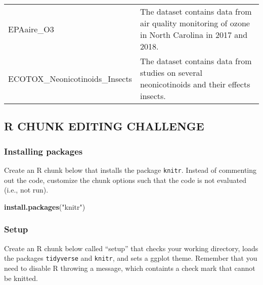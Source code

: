 \documentclass[]{article}
\newenvironment{Shaded}{\begin{snugshade}}{\end{snugshade}}
\newcommand{\KeywordTok}[1]{\textcolor[rgb]{0.13,0.29,0.53}{\textbf{#1}}}
\newcommand{\NormalTok}[1]{#1}
\newcommand{\StringTok}[1]{\textcolor[rgb]{0.31,0.60,0.02}{#1}}
\begin{document}
\begin{longtable}[]{@{}ll@{}}
\begin{minipage}[t]{0.37\columnwidth}\raggedright
EPAaire\_O3\strut
\end{minipage} & \begin{minipage}[t]{0.57\columnwidth}\raggedright
The dataset contains data from air quality monitoring of ozone in North
Carolina in 2017 and 2018.\strut
\end{minipage}\tabularnewline
\begin{minipage}[t]{0.37\columnwidth}\raggedright
ECOTOX\_Neonicotinoids\_Insects\strut
\end{minipage} & \begin{minipage}[t]{0.57\columnwidth}\raggedright
The dataset contains data from studies on several neonicotinoids and
their effects insects.\strut
\end{minipage}\tabularnewline
\bottomrule
\end{longtable}

\hypertarget{r-chunk-editing-challenge}{%
\subsection{R CHUNK EDITING CHALLENGE}\label{r-chunk-editing-challenge}}

\hypertarget{installing-packages}{%
\subsubsection{Installing packages}\label{installing-packages}}

Create an R chunk below that installs the package \texttt{knitr}.
Instead of commenting out the code, customize the chunk options such
that the code is not evaluated (i.e., not run).

\begin{Shaded}
\begin{Highlighting}[]
\KeywordTok{install.packages}\NormalTok{(}\StringTok{"knitr"}\NormalTok{)}
\end{Highlighting}
\end{Shaded}

\hypertarget{setup}{%
\subsubsection{Setup}\label{setup}}

Create an R chunk below called ``setup'' that checks your working
directory, loads the packages \texttt{tidyverse} and \texttt{knitr}, and
sets a ggplot theme. Remember that you need to disable R throwing a
message, which containts a check mark that cannot be knitted.
\end{document}
